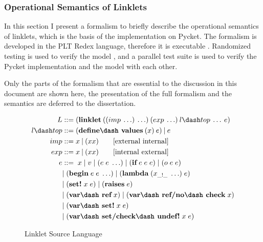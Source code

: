 
\subsubsection{Operational Semantics of Linklets}
\label{subsec:linklets-semantics}

In this section I present a formalism to briefly describe the
operational semantics of linklets, which is the basis of the
implementation on Pycket. The formalism is developed in the PLT Redex
language, therefore it is executable
\cite{felleisen2009semantics}. Randomized testing is used to verify
the model \cite{random-test:2009}, and a parallel test suite is used
to verify the Pycket implementation and the model with each other.

Only the parts of the formalism that are essential to the discussion
in this document are shown here, the presentation of the full
formalism and the semantics are deferred to the
dissertation.

\begin{wrapfigure}[14]{r}{0.45\textwidth}
  \vspace{-0.7cm}
  \footnotesize
  \begin{mdframed}
    \begin{align*}
      L  &::= (\textbf{linklet}\:((imp\: \ldots)\: \ldots)\:(exp\: \ldots)\:l\dash top\:\ldots\:e)\\
      l\dash top &::= (\textbf{define\dash values}\:(x)\:e)\:|\:e \\
      imp &::= x\:|\:(x x) \tag*{[external internal]}\\
      exp &::= x\:|\:(x x) \tag*{[internal external]} \\
      e &::=\; x\; |\; v\; |\; (e\; e\; \ldots)\; |\; (\textbf{if}\; e\; e\; e)\; |\; (o\; e\; e)\; \\
      \; &|\; (\textbf{begin}\; e\; e\; \ldots)\; |\; (\textbf{lambda}\; (x_{\_!\_}\; \ldots)\; e)\\
      \; &|\; (\textbf{set!}\; x\; e)\; |\; (\textbf{raises}\; e)\\
      \; &|\; (\textbf{var\dash ref}\; x)\; |\; (\textbf{var\dash ref/no\dash check}\; x) \\
      \; &|\; (\textbf{var\dash set!}\; x\; e)  \\
      \; &|\; (\textbf{var\dash set/check\dash undef!}\; x\; e)
    \end{align*}
  \caption[hede]{Linklet Source Language \footnotemark}
  \label{fig:linklet-source}
  \end{mdframed}
\end{wrapfigure}

